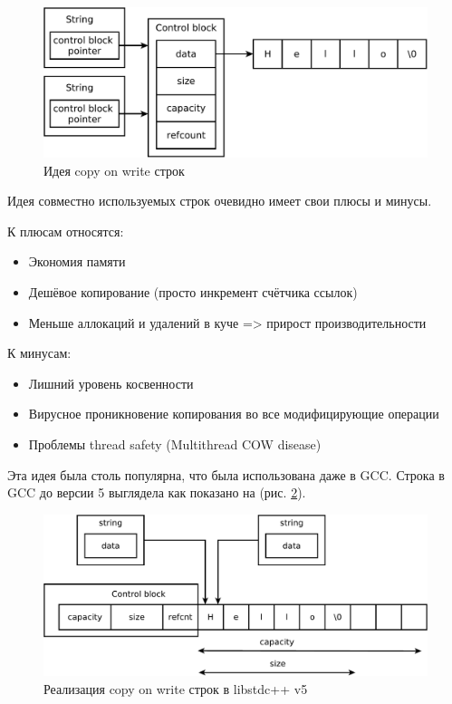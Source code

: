 \documentclass[a4paper,12pt,oneside]{article}
\begin{document}
\begin{figure}[ht]
\centering
\includegraphics[width=1.0\textwidth]{illustrations/cow-principal-crop.pdf}
\caption{Идея copy on write строк}
\label{fig:principal-cow}
\end{figure}

Идея совместно используемых строк очевидно имеет свои плюсы и минусы.

К плюсам относятся:

\begin{itemize}
\item Экономия памяти
\item Дешёвое копирование (просто инкремент счётчика ссылок)
\item Меньше аллокаций и удалений в куче => прирост производительности
\end{itemize}

К минусам:

\begin{itemize}
\item Лишний уровень косвенности
\item Вирусное проникновение копирования во все модифицирующие операции
\item Проблемы thread safety (Multithread COW disease)
\end{itemize}

Эта идея была столь популярна, что была использована даже в GCC. Строка в GCC до версии 5 выглядела как показано на (рис. \ref{fig:string-cow-gcc}).

\begin{figure}[ht]
\centering
\includegraphics[width=1.0\textwidth]{illustrations/string-cow-gcc-crop.pdf}
\caption{Реализация copy on write строк в libstdc++ v5}
\label{fig:string-cow-gcc}
\end{figure}
\end{document}

